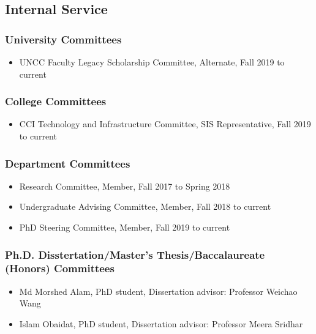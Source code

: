 
\hypertarget{internal-service}{%
\subsection{Internal Service}\label{internal-service}}

\hypertarget{university-committees}{%
\subsubsection{University Committees}\label{university-committees}}
\begin{itemize}
\item UNCC Faculty Legacy Scholarship Committee, Alternate, Fall 2019 to current
\end{itemize}

\hypertarget{college-committees}{%
\subsubsection{College Committees}\label{college-committees}}
\begin{itemize}
\item CCI Technology and Infrastructure Committee, SIS Representative, Fall 2019 to current
\end{itemize}

\hypertarget{dept-committees}{%
\subsubsection{Department Committees}\label{dept-committees}}
\begin{itemize}
\item Research Committee, Member, Fall 2017 to Spring 2018
\item Undergraduate Advising Committee, Member, Fall 2018 to current
\item PhD Steering Committee, Member, Fall 2019 to current
\end{itemize}

\hypertarget{thesis-committees}{%
\subsubsection{Ph.D. Disstertation/Master's Thesis/Baccalaureate (Honors) Committees}\label{thesis-committees}}
\begin{itemize}
\item Md Morshed Alam, PhD student, Dissertation advisor: Professor Weichao Wang
\item Islam Obaidat, PhD student, Dissertation advisor: Professor Meera Sridhar
\end{itemize}

